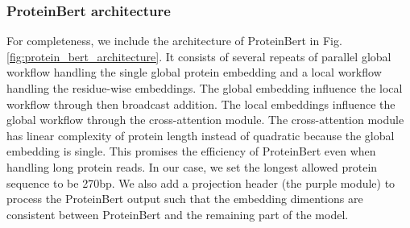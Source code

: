 \documentclass{article}
\begin{document}
\subsubsection{ProteinBert architecture}
For completeness, we include the architecture of ProteinBert in Fig. \ref{fig:protein_bert_architecture}. It consists of several repeats of parallel global workflow handling the single global protein embedding and a local workflow handling the residue-wise embeddings. The global embedding influence the local workflow through then broadcast addition. The local embeddings influence the global workflow through the cross-attention module. The cross-attention module has linear complexity of protein length instead of quadratic because the global embedding is single. This promises the efficiency of ProteinBert even when handling long protein reads. In our case, we set the longest allowed protein sequence to be 270bp. We also add a projection header (the purple module) to process the ProteinBert output such that the embedding dimentions are consistent between ProteinBert and the remaining part of the model.
\end{document}
